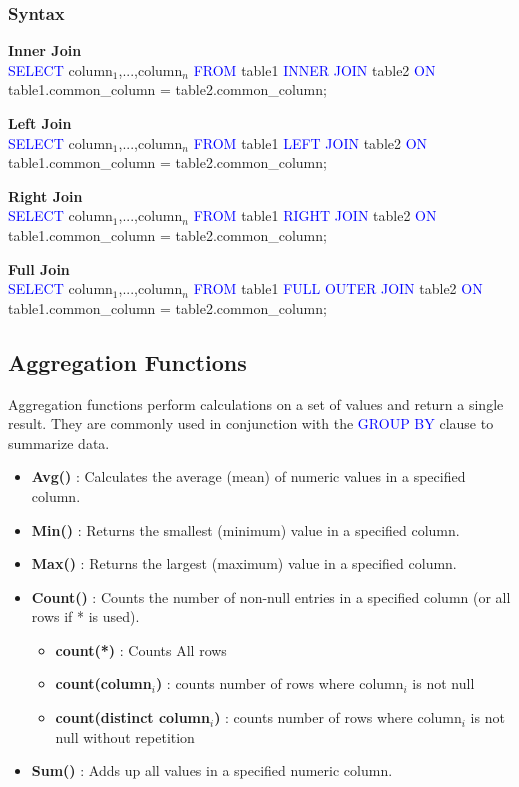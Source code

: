 \subsubsection*{ \textbf{Syntax}}
\begin{tcolorbox}[title =Joins]
 \textbf{Inner Join}\\
\textcolor{blue}{SELECT} column$_{1}$,...,column$_{n}$ \textcolor{blue}{FROM} table1 \textcolor{blue}{INNER JOIN} 
table2 \textcolor{blue}{ON} table1.common\_column = table2.common\_column;

 \textbf{Left Join}\\
\textcolor{blue}{SELECT} column$_{1}$,...,column$_{n}$ \textcolor{blue}{FROM} table1 \textcolor{blue}{LEFT JOIN} 
table2 \textcolor{blue}{ON} table1.common\_column = table2.common\_column;

\textbf{Right Join}\\
\textcolor{blue}{SELECT} column$_{1}$,...,column$_{n}$ \textcolor{blue}{FROM} table1 \textcolor{blue}{RIGHT JOIN} 
table2 \textcolor{blue}{ON} table1.common\_column = table2.common\_column;

\textbf{Full Join}\\
\textcolor{blue}{SELECT} column$_{1}$,...,column$_{n}$ \textcolor{blue}{FROM} table1 \textcolor{blue}{FULL OUTER JOIN} 
table2 \textcolor{blue}{ON} table1.common\_column = table2.common\_column;
\end{tcolorbox}

 \subsection{Aggregation Functions}
\begin{tcolorbox}[title = Definition]
   Aggregation functions perform calculations on a set of values and return a single result. They are commonly used in conjunction with the \textcolor{blue}{GROUP BY} clause to summarize data.
   \begin{itemize}
    \item \textbf{Avg()} : Calculates the average (mean) of numeric values in a specified column.
    \item \textbf{Min()} : Returns the smallest (minimum) value in a specified column.
    \item \textbf{Max()} : Returns the largest (maximum) value in a specified column.
    \item \textbf{Count()} : Counts the number of non-null entries in a specified column (or all rows if * is used).
      \begin{itemize}
        \item  \textbf{count(*)} : Counts All rows
        \item  \textbf{count(column$_{i}$)} : counts number of rows where column$_{i}$ is not null
        \item  \textbf{count(distinct column$_{i}$)} : counts number of rows where column$_{i}$ is not null without repetition
    \end{itemize}
    \item \textbf{Sum()} : Adds up all values in a specified numeric column.
   \end{itemize} 
\end{tcolorbox}


